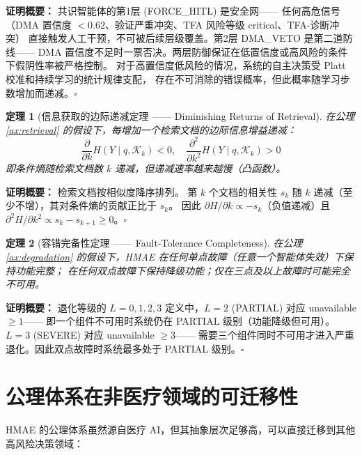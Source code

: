 \documentclass[11pt,a4paper]{ctexart}
\newtheorem{theorem}{定理}[section]
\theoremstyle{remark}
\begin{document}
\textbf{证明概要：} 共识智能体的第1层 (FORCE\_HITL) 是安全网——
任何高危信号（DMA 置信度 $< 0.62$、验证严重冲突、TFA 风险等级 critical、TFA-诊断冲突）
直接触发人工干预，不可被后续层级覆盖。第2层 DMA\_VETO 是第二道防线——
DMA 置信度不足时一票否决。两层防御保证在低置信度或高风险的条件下假阴性率被严格控制。
对于高置信度低风险的情况，系统的自主决策受 Platt 校准和持续学习的统计规律支配，
存在不可消除的错误概率，但此概率随学习步数增加而递减。$\square$

\begin{theorem}[信息获取的边际递减定理 —— Diminishing Returns of Retrieval]
在公理 \ref{ax:retrieval} 的假设下，每增加一个检索文档的边际信息增益递减：
\begin{equation}
\frac{\partial}{\partial k} H(Y \mid q, \mathcal{K}_k) < 0, \quad
\frac{\partial^2}{\partial k^2} H(Y \mid q, \mathcal{K}_k) > 0
\end{equation}
即条件熵随检索文档数 $k$ 递减，但递减速率越来越慢（凸函数）。
\end{theorem}

\textbf{证明概要：} 检索文档按相似度降序排列。
第 $k$ 个文档的相关性 $s_k$ 随 $k$ 递减（至少不增），其对条件熵的贡献正比于 $s_k$。
因此 $\partial H / \partial k \propto -s_k$（负值递减）且 $\partial^2 H / \partial k^2 \propto s_k - s_{k+1} \geq 0$。$\square$

\begin{theorem}[容错完备性定理 —— Fault-Tolerance Completeness]
在公理 \ref{ax:degradation} 的假设下，HMAE 在任何单点故障（任意一个智能体失效）下保持功能完整；
在任何双点故障下保持降级功能；仅在三点及以上故障时可能完全不可用。
\end{theorem}

\textbf{证明概要：} 退化等级的 $L=0,1,2,3$ 定义中，$L=2$ (PARTIAL) 对应 unavailable $\geq 1$——
即一个组件不可用时系统仍在 PARTIAL 级别（功能降级但可用）。$L=3$ (SEVERE) 对应 unavailable $\geq 3$——
需要三个组件同时不可用才进入严重退化。因此双点故障时系统最多处于 PARTIAL 级别。$\square$

\section{公理体系在非医疗领域的可迁移性}

HMAE 的公理体系虽然源自医疗 AI，但其抽象层次足够高，可以直接迁移到其他高风险决策领域：
\end{document}
